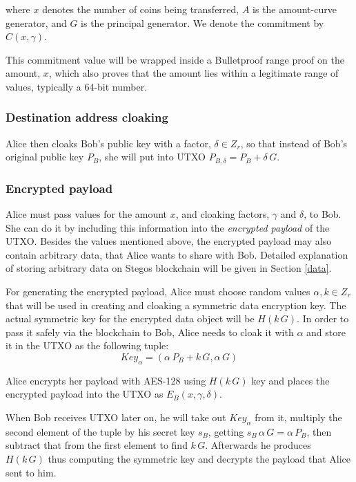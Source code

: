 \documentclass[a4paper, 10pt, conference]{ieeeconf}
\begin{document}
where $x$ denotes the number of coins being transferred, $A$ is the amount-curve generator, and $G$ is the principal generator. We denote the commitment by $C(x, \gamma)$. 

This commitment value will be wrapped inside a Bulletproof range proof on the amount, $x$, which also proves that the amount lies within a legitimate range of values, typically a 64-bit number.

\subsubsection{Destination address cloaking} Alice then cloaks Bob's public key with a factor, $\delta \in Z_r$, so that instead of Bob's original public key $P_B$, she will put into UTXO $P_{B, \delta} = P_B + \delta \, G$.


\subsubsection{Encrypted payload} Alice must pass values for the amount $x$, and cloaking factors, $\gamma$ and $\delta$, to Bob. She can do it by including this information into the \textit{encrypted payload} of the UTXO. Besides the values mentioned above, the encrypted payload may also contain arbitrary data, that Alice wants to share with Bob. Detailed explanation of storing arbitrary data on Stegos blockchain will be given in Section \ref{data}. 

For generating the encrypted payload, Alice must choose random values $\alpha, k \in Z_r$ that will be used in creating and cloaking a symmetric data encryption key.
The actual symmetric key for the encrypted data object will be $H(k \, G)$. In order to pass it safely via the blockchain to Bob, Alice needs to cloak it with $\alpha$ and store it in the UTXO as the following tuple: $$Key_{\alpha} = (\alpha \, P_{B} + k \, G, \alpha \, G )$$ 

Alice encrypts her payload with AES-128 using $H(k \, G)$ key and places the encrypted payload into the UTXO as $E_B(x, \gamma, \delta)$.

When Bob receives UTXO later on, he will take out $Key_{\alpha}$ from it, multiply the second element of the tuple by his secret key $s_B$, getting $s_B \, \alpha \, G = \alpha \, P_B$, then subtract that from the first element to find $k \, G$. Afterwards he produces $H(k \, G)$ thus computing the symmetric key and decrypts the payload that Alice sent to him.
\end{document}
